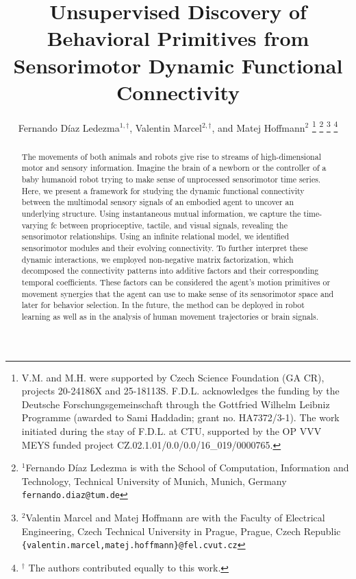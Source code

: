 \documentclass[letterpaper, 10 pt, conference]{ieeeconf}  %
\title{\LARGE \bf
Unsupervised Discovery of Behavioral Primitives from Sensorimotor Dynamic Functional Connectivity
}
\author{Fernando D\'iaz Ledezma$^{1,\dagger}$, Valentin Marcel$^{2,\dagger}$, and Matej Hoffmann$^{2}$%
\thanks{V.M. and M.H. were supported by Czech Science Foundation (GA CR), projects 20-24186X and 25-18113S.  F.D.L. acknowledges the funding by the Deutsche Forschungsgemeinschaft through the Gottfried Wilhelm Leibniz Programme (awarded to Sami Haddadin; grant no. HA7372/3-1). The work initiated during the stay of F.D.L. at CTU, supported by the OP VVV MEYS funded project CZ.02.1.01/0.0/0.0/16\_019/0000765.}%
\thanks{$^{1}$Fernando D\'iaz Ledezma is with the School of Computation, Information and Technology, Technical University of Munich, Munich, Germany {\tt\small fernando.diaz@tum.de}}%
\thanks{$^{2}$Valentin Marcel and Matej Hoffmann are with the Faculty of Electrical Engineering, Czech Technical University in Prague, Prague, Czech Republic
        {\tt\small \{valentin.marcel,matej.hoffmann\}@fel.cvut.cz}}%
\thanks{$^\dagger$ The authors contributed equally to this work.}
}
\begin{document}
\maketitle

\begin{abstract}
The movements of both animals and robots give rise to streams of high-dimensional motor and sensory information. Imagine the brain of a newborn or the controller of a baby humanoid robot trying to make sense of unprocessed sensorimotor time series. Here, we present a framework for studying the dynamic functional connectivity between the multimodal sensory signals of an embodied agent to uncover an underlying structure. Using instantaneous mutual information, we capture the time-varying \ac{fc} between proprioceptive, tactile, and visual signals, revealing the sensorimotor relationships. Using an infinite relational model, we identified sensorimotor modules and their evolving connectivity. To further interpret these dynamic interactions, we employed non-negative matrix factorization, which decomposed the connectivity patterns into additive factors and their corresponding temporal coefficients. These factors can be considered the agent’s motion primitives or movement synergies that the agent can use to make sense of its sensorimotor space and later for behavior selection. In the future, the method can be deployed in robot learning as well as in the analysis of human movement trajectories or brain signals.
\end{abstract}
\end{document}
